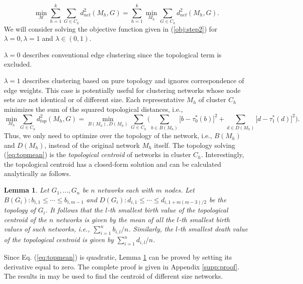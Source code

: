 \documentclass{article} %
\newtheorem{lemma}{Lemma}
\begin{document}
\begin{equation}
\min_{\mathcal{M}} \sum_{h=1}^k \sum_{G \in C_h} d^2_{net}(M_h,G) = \sum_{h=1}^k \min_{M_h} \sum_{G \in C_h} d^2_{net}(M_h,G) .
\label{obj:step2}
\end{equation} 
We will consider solving the objective function given in (\ref{obj:step2}) for $\lambda = 0, \lambda = 1$ and $\lambda \in (0,1)$.

$\lambda=0$ describes conventional edge clustering \citep{macqueen1967some} since the topological term is excluded.

$\lambda = 1$ describes clustering based on pure topology and ignores correspondence of edge weights. This case is potentially useful for clustering networks whose node sets are not identical or of different size. Each representative $M_h$ of cluster $C_h$ minimizes the sum of the squared topological distances, i.e.,
\begin{equation}
\min_{M_h} \sum_{G \in C_h} d_{top}^2(M_h,G) = \min_{B(M_h),D(M_h)} \sum_{G \in C_h} \Big( \sum_{b \in B(M_h)} \big[ b - \tau_{0}^*(b)\big]^2 + \sum_{d \in D(M_h)} \big[ d - \tau_{1}^*(d)\big]^2 \Big) .
\label{eq:topmean}
\end{equation}
Thus, we only need to optimize over the topology of the network, i.e., $B(M_h)$ and $D(M_h)$, instead of the original network $M_h$ itself. 
The topology solving (\ref{eq:topmean}) is the {\em topological centroid} of networks in cluster $C_h$.
Interestingly, the topological centroid has a closed-form solution and can be calculated analytically as follows.

\begin{lemma}
Let $G_1,...,G_n$ be $n$ networks each with $m$ nodes. 
Let $B(G_i): b_{i,1} \leq \cdots \leq b_{i,m-1}$ and $D(G_i): d_{i,1} \leq \cdots \leq d_{i,1+m(m-3)/2}$ be the topology of $G_i$.
It follows that the $l$-th smallest birth value of the topological centroid of the $n$ networks is given by the mean of all the $l$-th smallest birth values of such networks, i.e., 
$ \sum_{i=1}^n b_{i,l} / n $.
Similarly, the $l$-th smallest death value of the topological centroid is given by $\sum_{i=1}^n d_{i,l} / n$.
\label{lemma:topmean}
\end{lemma}

Since Eq. (\ref{eq:topmean}) is quadratic, Lemma \ref{lemma:topmean} can be proved by setting its derivative equal to zero. The complete proof is given in Appendix \ref{supp:proof}. The results in \citep{songdechakraiwut2020topological,songdechakraiwut2022topological} may be used to find the centroid of different size networks.
\end{document}
